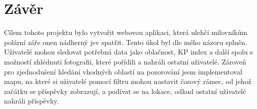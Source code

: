 \section{Závěr}

\par Cílem tohoto projektu bylo vytvořit webovou aplikaci, která ulehčí milovníkům polární záře onen nádherný jev spatřit. Tento úkol byl dle mého názoru splněn. Uživatelé mohou sledovat potřebná data jako oblačnost, KP index a další spolu s možností zhlédnutí fotografií, které pořídili a nahráli ostatní uživatelé. Zároveň pro zjednodušení hledání vhodných oblastí na pozorování jsem implementoval mapu, na které si uživatelé pomocí filtru mohou nastavit časový rámec, od jehož začátku se příspěvky zobrazují, a podívat se na lokace, odkud ostatní uživatelé nahráli příspěvky.